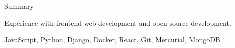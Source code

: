 \documentclass{resume} %
\begin{document}

\begin{rSection}{Summary}
  \begin{rSummarySection}
  {
    \item Experience with frontend web development and open source development.
    \item JavaScript, Python, Django, Docker, React, Git, Mercurial, MongoDB.
  }
  \end{rSummarySection}
\end{rSection}

\end{document}
